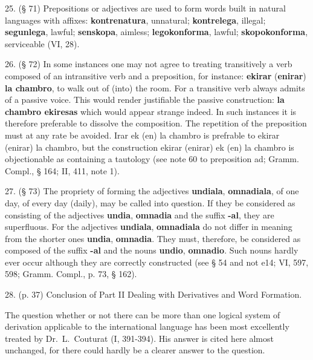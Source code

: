 25. (§ 71) Prepositions or adjectives are used to form words built in natural languages with affixes: \textbf{kontrenatura}, unnatural; \textbf{kontrelega}, illegal; \textbf{segunlega}, lawful; \textbf{senskopa}, aimless; \textbf{legokonforma}, lawful; \textbf{skopokonforma}, serviceable (VI, 28).  %

26. (§ 72) In some instances one may not agree to treating transitively a verb composed of an intransitive verb and a preposition, for instance: \textbf{ekirar }(\textbf{enirar})\textbf{ la chambro}, to walk out of (into) the room. For a transitive verb always admits of a passive voice. This would render justifiable the passive construction: \textbf{la chambro ekiresas} which would appear strange indeed. In such instances it is therefore preferable to dissolve the composition. The repetition of the preposition must at any rate be avoided. Irar ek (en) la chambro is prefrable to ekirar (enirar) la chambro, but the construction ekirar (enirar) ek (en) la chambro is objectionable as containing a tautology (see note 60 to preposition ad; Gramm. Compl., § 164; II, 411, note 1).  %

27. (§ 73) The propriety of forming the adjectives \textbf{undiala}, \textbf{omnadiala}, of one day, of every day (daily), may be called into question. If they be considered as consisting of the adjectives \textbf{undia}, \textbf{omnadia} and the suffix \textbf{-al}, they are superfluous. For the adjectives \textbf{undiala}, \textbf{omnadiala} do not differ in meaning from the shorter ones \textbf{undia}, \textbf{omnadia}. They must, therefore, be considered as composed of the suffix \textbf{-al} and the nouns \textbf{undio}, \textbf{omnadio}. Such nouns hardly ever occur although they are correctly constructed (see § 54 and not e14; VI, 597, 598; Gramm. Compl., p. 73, § 162). %

28. (p. 37) Conclusion of Part II Dealing with Derivatives and Word Formation. %

The question whether or not there can be more than one logical system of derivation applicable to the international language has been most excellently treated by Dr.~L.~Couturat (I, 391-394). His answer is cited here almost unchanged, for there could hardly be a clearer answer to the question.

